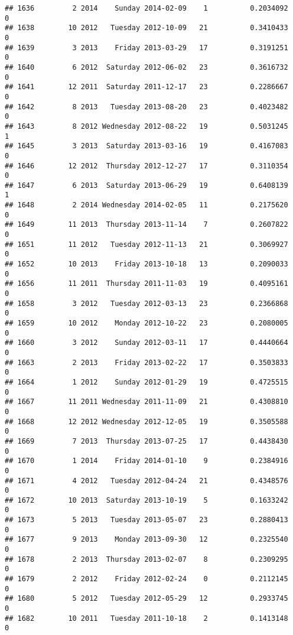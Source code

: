 \documentclass[
]{article}
\begin{document}
\begin{verbatim}
## 1636         2 2014    Sunday 2014-02-09    1          0.2034092             0
## 1638        10 2012   Tuesday 2012-10-09   21          0.3410433             0
## 1639         3 2013    Friday 2013-03-29   17          0.3191251             0
## 1640         6 2012  Saturday 2012-06-02   23          0.3616732             0
## 1641        12 2011  Saturday 2011-12-17   23          0.2286667             0
## 1642         8 2013   Tuesday 2013-08-20   23          0.4023482             0
## 1643         8 2012 Wednesday 2012-08-22   19          0.5031245             1
## 1645         3 2013  Saturday 2013-03-16   19          0.4167083             0
## 1646        12 2012  Thursday 2012-12-27   17          0.3110354             0
## 1647         6 2013  Saturday 2013-06-29   19          0.6408139             1
## 1648         2 2014 Wednesday 2014-02-05   11          0.2175620             0
## 1649        11 2013  Thursday 2013-11-14    7          0.2607822             0
## 1651        11 2012   Tuesday 2012-11-13   21          0.3069927             0
## 1652        10 2013    Friday 2013-10-18   13          0.2090033             0
## 1656        11 2011  Thursday 2011-11-03   19          0.4095161             0
## 1658         3 2012   Tuesday 2012-03-13   23          0.2366868             0
## 1659        10 2012    Monday 2012-10-22   23          0.2080005             0
## 1660         3 2012    Sunday 2012-03-11   17          0.4440664             0
## 1663         2 2013    Friday 2013-02-22   17          0.3503833             0
## 1664         1 2012    Sunday 2012-01-29   19          0.4725515             0
## 1667        11 2011 Wednesday 2011-11-09   21          0.4308810             0
## 1668        12 2012 Wednesday 2012-12-05   19          0.3505588             0
## 1669         7 2013  Thursday 2013-07-25   17          0.4438430             0
## 1670         1 2014    Friday 2014-01-10    9          0.2384916             0
## 1671         4 2012   Tuesday 2012-04-24   21          0.4348576             0
## 1672        10 2013  Saturday 2013-10-19    5          0.1633242             0
## 1673         5 2013   Tuesday 2013-05-07   23          0.2880413             0
## 1677         9 2013    Monday 2013-09-30   12          0.2325540             0
## 1678         2 2013  Thursday 2013-02-07    8          0.2309295             0
## 1679         2 2012    Friday 2012-02-24    0          0.2112145             0
## 1680         5 2012   Tuesday 2012-05-29   12          0.2933745             0
## 1682        10 2011   Tuesday 2011-10-18    2          0.1413148             0

\end{verbatim}
\end{document}

